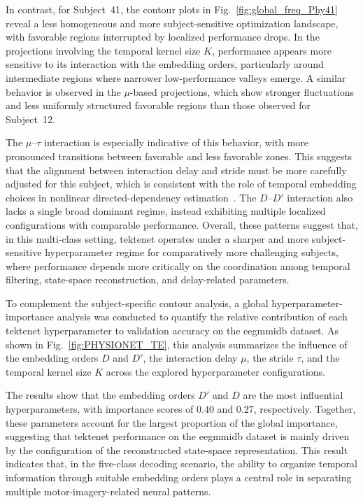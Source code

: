 {In contrast, for Subject~41, the contour plots in Fig.~\ref{fig:global_freq_Phy41} reveal a less homogeneous and more subject-sensitive optimization landscape, with favorable regions interrupted by localized performance drops. In the projections involving the temporal kernel size $K$, performance appears more sensitive to its interaction with the embedding orders, particularly around intermediate regions where narrower low-performance valleys emerge. A similar behavior is observed in the $\mu$-based projections, which show stronger fluctuations and less uniformly structured favorable regions than those observed for Subject~12.}

{The $\mu$--$\tau$ interaction is especially indicative of this behavior, with more pronounced transitions between favorable and less favorable zones. This suggests that the alignment between interaction delay and stride must be more carefully adjusted for this subject, which is consistent with the role of temporal embedding choices in nonlinear directed-dependency estimation~\cite{takens1981detecting, schreiber2000measuring}. The $D$--$D'$ interaction also lacks a single broad dominant regime, instead exhibiting multiple localized configurations with comparable performance. Overall, these patterns suggest that, in this multi-class setting, \gls{tektenet} operates under a sharper and more subject-sensitive hyperparameter regime for comparatively more challenging subjects, where performance depends more critically on the coordination among temporal filtering, state-space reconstruction, and delay-related parameters.}

{To complement the subject-specific contour analysis, a global hyperparameter-importance analysis was conducted to quantify the relative contribution of each \gls{tektenet} hyperparameter to validation accuracy on the \gls{eegmmidb} dataset. As shown in Fig.~\ref{fig:PHYSIONET_TE}, this analysis summarizes the influence of the embedding orders $D$ and $D'$, the interaction delay $\mu$, the stride $\tau$, and the temporal kernel size $K$ across the explored hyperparameter configurations.}

{The results show that the embedding orders $D'$ and $D$ are the most influential hyperparameters, with importance scores of $0.40$ and $0.27$, respectively. Together, these parameters account for the largest proportion of the global importance, suggesting that \gls{tektenet} performance on the \gls{eegmmidb} dataset is mainly driven by the configuration of the reconstructed state-space representation. This result indicates that, in the five-class decoding scenario, the ability to organize temporal information through suitable embedding orders plays a central role in separating multiple motor-imagery-related neural patterns.}

